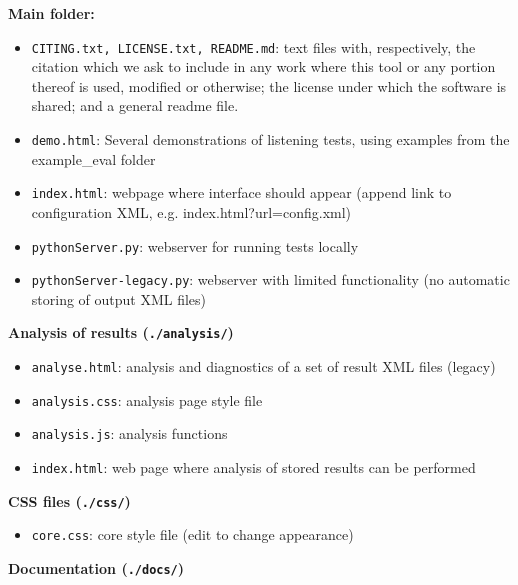 \documentclass[11pt, oneside]{article}   	%
\begin{document}
		\textbf{Main folder:} 
			\begin{itemize}
            	\item \texttt{CITING.txt, LICENSE.txt, README.md}: text files with, respectively, the citation which we ask to include in any work where this tool or any portion thereof is used, modified or otherwise; the license under which the software is shared; and a general readme file.
            	\item \texttt{demo.html}: Several demonstrations of listening tests, using examples from the example\_eval folder
            	\item \texttt{index.html}: webpage where interface should appear (append link to configuration XML, e.g. index.html?url=config.xml)
            	\item \texttt{pythonServer.py}: webserver for running tests locally
            	\item \texttt{pythonServer-legacy.py}: webserver with limited functionality (no automatic storing of output XML files)
            	\\
			\end{itemize}
		\textbf{Analysis of results (\texttt{./analysis/})}
	        \begin{itemize}
         		\item \texttt{analyse.html}: analysis and diagnostics of a set of result XML files (legacy)
         		\item \texttt{analysis.css}: analysis page style file
         		\item \texttt{analysis.js}: analysis functions
         		\item \texttt{index.html}: web page where analysis of stored results can be performed
			\end{itemize}
		\textbf{CSS files (\texttt{./css/})}
			\begin{itemize}
				\item \texttt{core.css}: core style file (edit to change appearance)
			\end{itemize}
	    \textbf{Documentation (\texttt{./docs/})}
\end{document}
